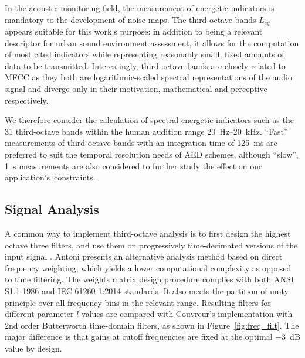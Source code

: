 \documentclass[sensors,article,accept,moreauthors,pdftex,10pt,a4paper]{mdpi}
\begin{document}
In the acoustic monitoring field, the measurement of energetic indicators is mandatory to the development of noise maps. The third-octave bands $L_{eq}$ appears suitable for this work's purpose: in addition to being a relevant descriptor \cite{torija2013} for urban sound environment assessment, it allows for the computation of most cited indicators while representing reasonably small, fixed amounts of data to be transmitted. Interestingly, third-octave bands are closely related to MFCC as they both are logarithmic-scaled spectral representations of the audio signal and diverge only in their motivation, mathematical and perceptive respectively.

We therefore consider the calculation of spectral energetic indicators such as the 31 third-octave bands within the human audition range 20~Hz--20~kHz. ``Fast'' measurements of third-octave bands with an integration time of 125~ms are preferred to suit the temporal resolution needs of AED schemes, although ``slow'', 1~s measurements are also considered to further study the effect on our \mbox{application's constraints.}

\subsection{Signal Analysis}

A common way to implement third-octave analysis is to first design the highest octave three filters, and use them on progressively time-decimated versions of the input signal \cite{davis1986}. {Antoni} %
 \cite{antoni2010} {presents} an alternative analysis method based on direct frequency weighting, which yields a lower computational complexity as opposed to time filtering. The weights matrix design procedure complies with both ANSI S1.1-1986 \cite{citeulike:9580295} and IEC 61260-1:2014 \cite{iec-norm} standards. It also meets the partition of unity principle over all frequency bins in the relevant range. Resulting filters for different parameter $l$ values are compared with Couvreur's implementation \cite{couvreur} with 2nd order Butterworth time-domain filters, as shown in Figure~\ref{fig:freq_filt}. The major difference is that gains at cutoff frequencies are fixed at the optimal $-3$~dB value by design.
\vspace{-6pt}
\end{document}
